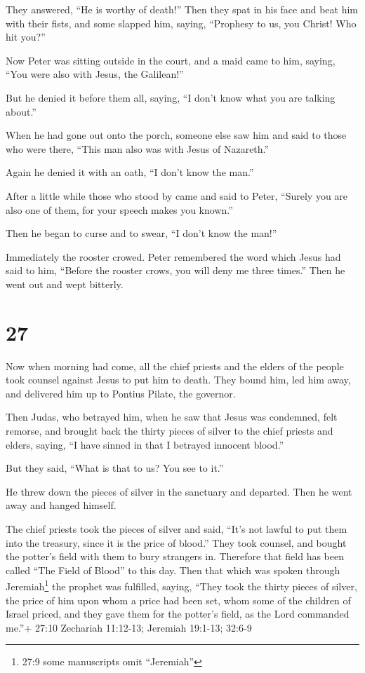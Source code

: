 They answered, ``He is worthy of death!''  Then they spat
in his face and beat him with their fists, and some slapped him,
 saying, ``Prophesy to us, you Christ! Who hit you?''

 Now Peter was sitting outside in the court, and a maid
came to him, saying, ``You were also with Jesus, the Galilean!''

 But he denied it before them all, saying, ``I don't know
what you are talking about.''

 When he had gone out onto the porch, someone else saw him
and said to those who were there, ``This man also was with Jesus of
Nazareth.''

 Again he denied it with an oath, ``I don't know the man.''

 After a little while those who stood by came and said to
Peter, ``Surely you are also one of them, for your speech makes you
known.''

 Then he began to curse and to swear, ``I don't know the
man!''

Immediately the rooster crowed.  Peter remembered the word
which Jesus had said to him, ``Before the rooster crows, you will deny
me three times.'' Then he went out and wept bitterly.

\hypertarget{section-26}{%
\section{27}\label{section-26}}

 Now when morning had come, all the chief priests and the
elders of the people took counsel against Jesus to put him to death.
 They bound him, led him away, and delivered him up to
Pontius Pilate, the governor.

 Then Judas, who betrayed him, when he saw that Jesus was
condemned, felt remorse, and brought back the thirty pieces of silver to
the chief priests and elders,  saying, ``I have sinned in
that I betrayed innocent blood.''

But they said, ``What is that to us? You see to it.''

 He threw down the pieces of silver in the sanctuary and
departed. Then he went away and hanged himself.

 The chief priests took the pieces of silver and said,
``It's not lawful to put them into the treasury, since it is the price
of blood.''  They took counsel, and bought the potter's
field with them to bury strangers in.  Therefore that field
has been called ``The Field of Blood'' to this day.  Then
that which was spoken through Jeremiah\footnote{27:9 some manuscripts
  omit ``Jeremiah''} the prophet was fulfilled, saying, ``They took the
thirty pieces of silver, the price of him upon whom a price had been
set, whom some of the children of Israel priced,  and they
gave them for the potter's field, as the Lord commanded me.''+ 27:10
Zechariah 11:12-13; Jeremiah 19:1-13; 32:6-9

